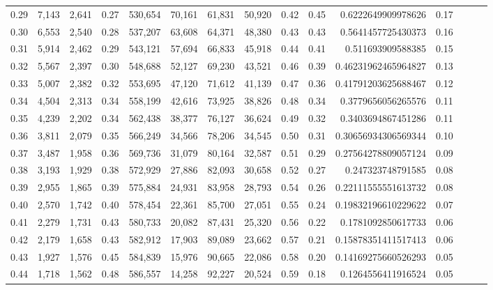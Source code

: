 \begin{tabular}{rrrrrrrrrrrrrrr}
0.29 &   7,143 &  2,641 &  0.27 &  530,654 &   70,161 &   61,831 &   50,920 &  0.42 &  0.45 &      0.6222649909978626 &      0.17 \\
0.30 &   6,553 &  2,540 &  0.28 &  537,207 &   63,608 &   64,371 &   48,380 &  0.43 &  0.43 &      0.5641457725430373 &      0.16 \\
0.31 &   5,914 &  2,462 &  0.29 &  543,121 &   57,694 &   66,833 &   45,918 &  0.44 &  0.41 &       0.511693909588385 &      0.15 \\
0.32 &   5,567 &  2,397 &  0.30 &  548,688 &   52,127 &   69,230 &   43,521 &  0.46 &  0.39 &     0.46231962465964827 &      0.13 \\
0.33 &   5,007 &  2,382 &  0.32 &  553,695 &   47,120 &   71,612 &   41,139 &  0.47 &  0.36 &     0.41791203625688467 &      0.12 \\
0.34 &   4,504 &  2,313 &  0.34 &  558,199 &   42,616 &   73,925 &   38,826 &  0.48 &  0.34 &      0.3779656056265576 &      0.11 \\
0.35 &   4,239 &  2,202 &  0.34 &  562,438 &   38,377 &   76,127 &   36,624 &  0.49 &  0.32 &      0.3403694867451286 &      0.11 \\
0.36 &   3,811 &  2,079 &  0.35 &  566,249 &   34,566 &   78,206 &   34,545 &  0.50 &  0.31 &     0.30656934306569344 &      0.10 \\
0.37 &   3,487 &  1,958 &  0.36 &  569,736 &   31,079 &   80,164 &   32,587 &  0.51 &  0.29 &     0.27564278809057124 &      0.09 \\
0.38 &   3,193 &  1,929 &  0.38 &  572,929 &   27,886 &   82,093 &   30,658 &  0.52 &  0.27 &       0.247323748791585 &      0.08 \\
0.39 &   2,955 &  1,865 &  0.39 &  575,884 &   24,931 &   83,958 &   28,793 &  0.54 &  0.26 &     0.22111555551613732 &      0.08 \\
0.40 &   2,570 &  1,742 &  0.40 &  578,454 &   22,361 &   85,700 &   27,051 &  0.55 &  0.24 &     0.19832196610229622 &      0.07 \\
0.41 &   2,279 &  1,731 &  0.43 &  580,733 &   20,082 &   87,431 &   25,320 &  0.56 &  0.22 &      0.1781092850617733 &      0.06 \\
0.42 &   2,179 &  1,658 &  0.43 &  582,912 &   17,903 &   89,089 &   23,662 &  0.57 &  0.21 &     0.15878351411517413 &      0.06 \\
0.43 &   1,927 &  1,576 &  0.45 &  584,839 &   15,976 &   90,665 &   22,086 &  0.58 &  0.20 &     0.14169275660526293 &      0.05 \\
0.44 &   1,718 &  1,562 &  0.48 &  586,557 &   14,258 &   92,227 &   20,524 &  0.59 &  0.18 &      0.1264556411916524 &      0.05 \\

\end{tabular}
